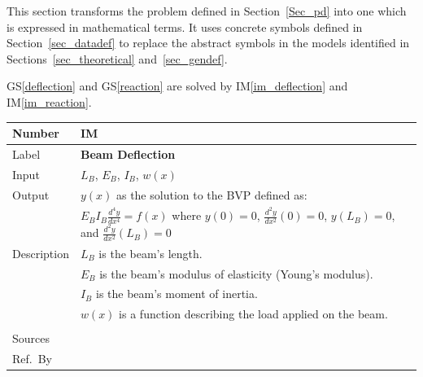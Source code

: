 \documentclass[12pt]{article}
\newcommand{\colAwidth}{0.13\textwidth}
\newcommand{\colBwidth}{0.82\textwidth}
\newcommand{\gsref}[1]{GS\ref{#1}}
\newcounter{instnum} %
\newcommand{\iref}[1]{IM\ref{#1}}
\begin{document}
This section transforms the problem defined in Section~\ref{Sec_pd} into one
which is expressed in mathematical terms. It uses concrete symbols defined in
Section~\ref{sec_datadef} to replace the abstract symbols in the models
identified in Sections~\ref{sec_theoretical} and~\ref{sec_gendef}.

\gsref{deflection} and \gsref{reaction} are solved by \iref{im_deflection} and \iref{im_reaction}.


\noindent
\begin{minipage}{\textwidth}
    \renewcommand*{\arraystretch}{1.5}
    \begin{tabular}{| p{\colAwidth} | p{\colBwidth}|}
        \hline
        \rowcolor[gray]{0.9}
        Number      & IM{instnum}\theinstnum{}\label{im_deflection}  \\
        \hline
        Label       & \bf Beam Deflection                                           \\
        \hline
        Input       & $L_B$, $E_B$, $I_B$, $w(x)$                                   \\
        \hline
        Output      & \(y(x)\) as the solution to the BVP defined as:               \\
                    & \(E_{B}I_{B}\frac{d^{4}y}{dx^{4}}=f(x)\) where \(y(0)=0\),
        \(\frac{d^{2}y}{dx^{2}}(0)=0\), \(y(L_B)=0\), and
        \(\frac{d^{2}y}{dx^{2}}(L_B)=0\)                                            \\
        \hline
        Description & $L_B$ is the beam's length.                                   \\
                    & $E_B$ is the beam's modulus of elasticity (Young's modulus).  \\
                    & $I_B$ is the beam's moment of inertia.                        \\
                    & $w(x)$ is a function describing the load applied on the beam. \\
        \\
        \hline
        Sources     & \nc{}                                                         \\
        \hline
        Ref.\ By    &                                                               \\
        \hline
    \end{tabular}
\end{minipage}\\
\end{document}

